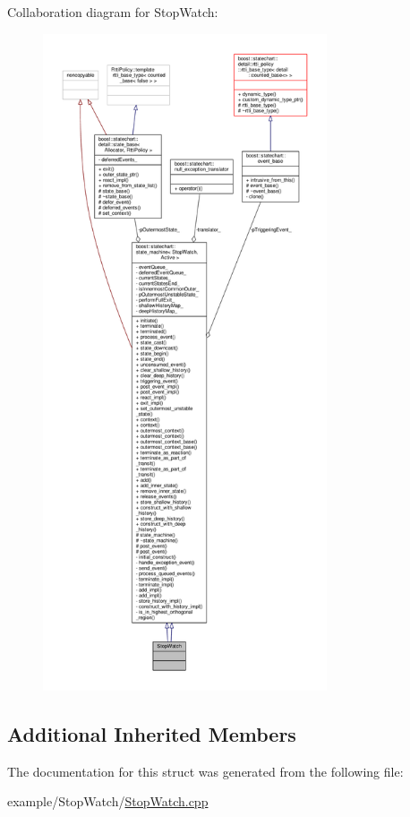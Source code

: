 Collaboration diagram for Stop\+Watch\+:
\nopagebreak
\begin{figure}[H]
\begin{center}
\leavevmode
\includegraphics[height=550pt]{struct_stop_watch__coll__graph}
\end{center}
\end{figure}
\subsection*{Additional Inherited Members}


The documentation for this struct was generated from the following file\+:\begin{DoxyCompactItemize}
\item 
example/\+Stop\+Watch/\mbox{\hyperlink{_stop_watch_8cpp}{Stop\+Watch.\+cpp}}\end{DoxyCompactItemize}
